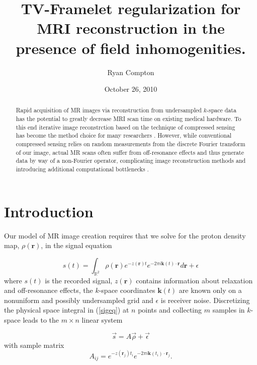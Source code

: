 \documentclass[11pt]{amsart}
\title{TV-Framelet regularization for MRI reconstruction in the
presence of field inhomogenities.}
\author{Ryan Compton}
\date{October 26, 2010}
\theoremstyle{remark}
\begin{document}
\begin{abstract}

Rapid acquisition of MR images via reconstruction from undersampled $k$-space data has the potential to greatly decrease MRI scan time on existing medical hardware. To this end iterative image reconstrction based on the technique of compressed sensing has become the method choice for many researchers \cite{Lustig2007}. However, while conventional compressed sensing relies on random measurements from the discrete Fourier transform of our image, actual MR scans often suffer from off-resonance effects and thus generate data by way of a non-Fourier operator, complicating image reconstruction methods and introducing additional computational bottlenecks \cite{Fessler2005}.

\end{abstract}

\maketitle


\section{Introduction}
Our model of MR image creation requires that we solve for the proton density map, $\rho(\mathbf{r})$, in the signal equation

\begin{equation}\label{sigeq}
s(t) = \int_{\mathbb{R}^2} \rho(\mathbf{r})e^{-z(\mathbf{r})t}e^{-2\pi i \mathbf{k}(t) \cdot \mathbf{r}} d\mathbf{r} + \epsilon
\end{equation}
where $s(t)$ is the recorded signal, $z(\mathbf{r})$ contains information about relaxation and off-resonance effects, the $k$-space coordinates $\mathbf{k}(t)$ are known only on a nonuniform and possibly undersampled grid and $\epsilon$ is receiver noise. Discretizing the physical space integral in (\ref{sigeq}) at $n$ points and collecting $m$ samples in $k$-space leads to the $m \times n$ linear system

\begin{equation}\label{dissigeq}
\vec{s} = A \vec{\rho} + \vec{\epsilon}
\end{equation}
with sample matrix
\begin{equation}\label{aij}
A_{ij} = e^{-z(\mathbf{r}_j)t_i}e^{-2\pi i \mathbf{k}(t_i) \cdot \mathbf{r}_j}.
\end{equation}
\end{document}

